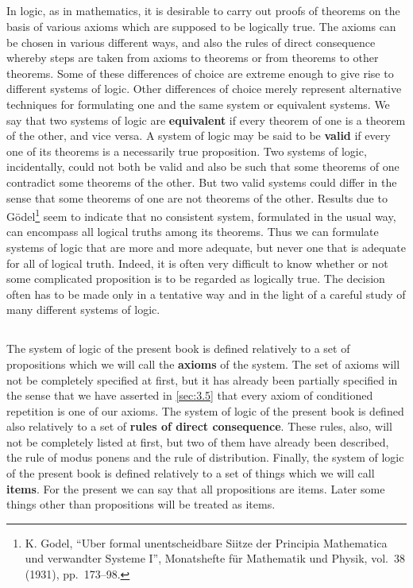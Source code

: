 \documentclass{book}
\let\oldmarginpar\marginpar
\renewcommand*{\marginpar}[1]{\oldmarginpar{\footnotesize#1}}
\begin{document}
\subsection{}
\label{sec:4.1}

In logic, as in mathematics, it is desirable to carry out proofs of theorems on the basis of various axioms which are supposed to be logically true.  The axioms can be chosen in various different ways, and also the rules of direct consequence whereby steps are taken from axioms to theorems or from theorems to other theorems.  Some of these differences of choice are extreme enough to give rise to different systems of logic.  Other differences of choice merely represent alternative techniques for formulating one and the same system or equivalent systems.  We say that two systems of logic are \textbf{equivalent} if every theorem of one is a theorem of the other, and vice versa.  A system of logic may be said to be \textbf{valid} if every one of its theorems is a necessarily true proposition.  Two systems of logic, incidentally, could not both be valid and also be such that some theorems of one contradict some theorems of the other.  But two valid systems could differ in the sense that some theorems of one are not theorems of the other.  Results due to Gödel\footnote{K. Godel, “Uber formal unentscheidbare Siitze der Principia Mathematica und verwandter Systeme I”, Monatshefte für Mathematik und Physik, vol.\ 38 (1931), pp.\ 173–98.} seem to indicate that no consistent system, \marginpar{\hfill 13}formulated in the usual way, can encompass all logical truths among its theorems.  Thus we can formulate systems of logic that are more and more adequate, but never one that is adequate for all of logical truth.  Indeed, it is often very difficult to know whether or not some complicated proposition is to be regarded as logically true.  The decision often has to be made only in a tentative way and in the light of a careful study of many different systems of logic.

\subsection{}
\label{sec:4.2}

The system of logic of the present book is defined relatively to a set of propositions which we will call the \textbf{axioms} of the system.  The set of axioms will not be completely specified at first, but it has already been partially specified in the sense that we have asserted in \ref{sec:3.5} that every axiom of conditioned repetition is one of our axioms.  The system of logic of the present book is defined also relatively to a set of \textbf{rules of direct consequence}.  These rules, also, will not be completely listed at first, but two of them have already been described, the rule of modus ponens and the rule of distribution.  Finally, the system of logic of the present book is defined relatively to a set of things which we will call \textbf{items}.  For the present we can say that all propositions are items.  Later some things other than propositions will be treated as items.
\end{document}
